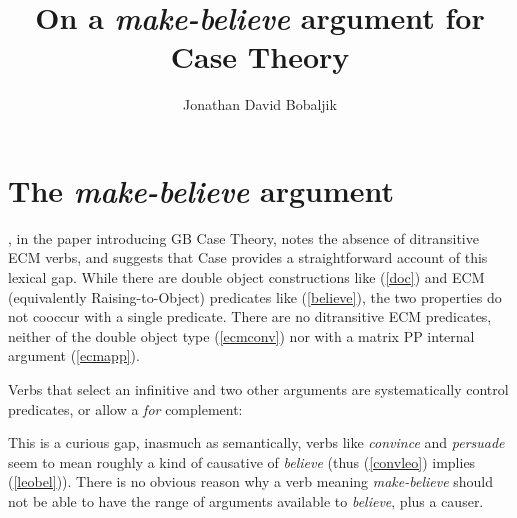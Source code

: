 \documentclass[output=paper]{LSP/langsci}
\title{On a \textit{make-believe} argument for Case Theory}
\author{Jonathan David Bobaljik}
\affiliation{University of Connecticut}
\begin{document}
\maketitle

\section{The \textit{make-believe} argument}



\citet[29]{chomsky80}, in the paper introducing GB Case Theory, notes the absence of ditransitive ECM verbs, and suggests that Case provides a straightforward account of this lexical gap. While there are double object constructions like (\ref{doc}) and ECM (equivalently Raising-to-Object) predicates like (\ref{believe}), the two properties do not cooccur with a single predicate. There are no ditransitive ECM predicates, neither of the double object type (\ref{ecmconv}) nor with a matrix PP internal argument (\ref{ecmapp}). 

\begin{exe}
 \label{doc}
 \label{believe}
\ex \label{convince}\begin{xlista}
 \label{ecmconv}
 \label{persuade}
 \label{ecmapp}
\end{xlista}
\end{exe}

Verbs that select an infinitive and two other arguments are systematically control predicates, or allow a \textit{for} complement: 

\begin{exe}
\ex \label{contr} \begin{xlista}
\end{xlista}
\end{exe}

This is a curious gap, inasmuch as semantically, verbs like \textit{convince} and \textit{persuade} seem to mean roughly a kind of causative of \textit{believe} (thus (\ref{convleo}) implies (\ref{leobel})). There is no obvious reason why a verb meaning \textit{make-believe} should not be able to have the range of arguments available to \textit{believe}, plus a causer.
\end{document}
